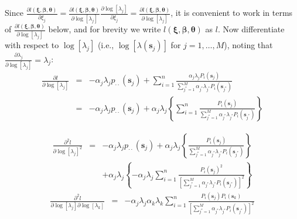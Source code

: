 \documentclass[a4paper]{article}
\begin{document}
Since $\frac{\partial l(\boldsymbol{\xi},\boldsymbol{\beta},\boldsymbol{\theta})}{\partial\xi_j}=\frac{\partial l(\boldsymbol{\xi},\boldsymbol{\beta},\boldsymbol{\theta})}{\partial\log[\lambda_j]}\frac{\partial\log[\lambda_j]}{\partial\xi_j}=\frac{\partial l(\boldsymbol{\xi},\boldsymbol{\beta},\boldsymbol{\theta})}{\partial\log[\lambda_j]}$, it is convenient to work in terms of $\frac{\partial l(\boldsymbol{\xi},\boldsymbol{\beta},\boldsymbol{\theta})}{\partial\log[\lambda_j]}$ below, and for brevity we write $l(\boldsymbol{\xi},\boldsymbol{\beta},\boldsymbol{\theta})$ as $l$. Now differentiate with respect to $\log[\lambda_j]$ (i.e., $\log[\lambda(\boldsymbol{s}_j)]$ for $j=1,\ldots,M$), noting that $\frac{\partial\lambda_j}{\partial\log[\lambda_j]}=\lambda_j$:
\begin{eqnarray}
\frac{\partial l}{\partial\log[\lambda_j]}
&=&
-\alpha_j\lambda_jp_{\cdot\cdot}(\boldsymbol{s}_j) 
+\sum_{i=1}^n
\frac{\alpha_j\lambda_jP_i(\boldsymbol{s}_j)}
{
\sum_{j^*=1}^M\alpha_{j^*}\lambda_{j^*}P_i(\boldsymbol{s}_{j^*})
} \nonumber \\
&=&-\alpha_j\lambda_jp_{\cdot\cdot}(\boldsymbol{s}_j) 
+
\alpha_j\lambda_j
\left\{
\sum_{i=1}^n
\frac{P_i(\boldsymbol{s}_j)}
{
\sum_{j^*=1}^M\alpha_{j^*}\lambda_{j^*}P_i(\boldsymbol{s}_{j^*})
}
\right\}
\end{eqnarray}

\begin{eqnarray}
\frac{\partial^2l}{\partial\log[\lambda_j]^2}
&=&-\alpha_j\lambda_jp_{\cdot\cdot}(\boldsymbol{s}_j) 
+
\alpha_j\lambda_j
\left\{
\frac{P_i(\boldsymbol{s}_j)}
{
\sum_{j^*=1}^M\alpha_{j^*}\lambda_{j^*}P_i(\boldsymbol{s}_{j^*})
}
\right\} \nonumber \\
& &+\alpha_j\lambda_j
\left\{
-\alpha_j\lambda_j
\sum_{i=1}^n
\frac{P_i(\boldsymbol{s}_j)^2}
{\left[
\sum_{j^*=1}^M\alpha_{j^*}\lambda_{j^*}P_i(\boldsymbol{s}_{j^*})
\right]^2}
\right\}
\end{eqnarray}
\begin{eqnarray}
\frac{\partial^2l}{\partial\log[\lambda_j]\partial\log[\lambda_k]}
&=&
-\alpha_j\lambda_j
\alpha_k\lambda_k
\sum_{i=1}^n
\frac{P_i(\boldsymbol{s}_j)P_i(\boldsymbol{s}_k)}
{\left[
\sum_{j^*=1}^M\alpha_{j^*}\lambda_{j^*}P_i(\boldsymbol{s}_{j^*})
\right]^2}
\end{eqnarray}
\end{document}
